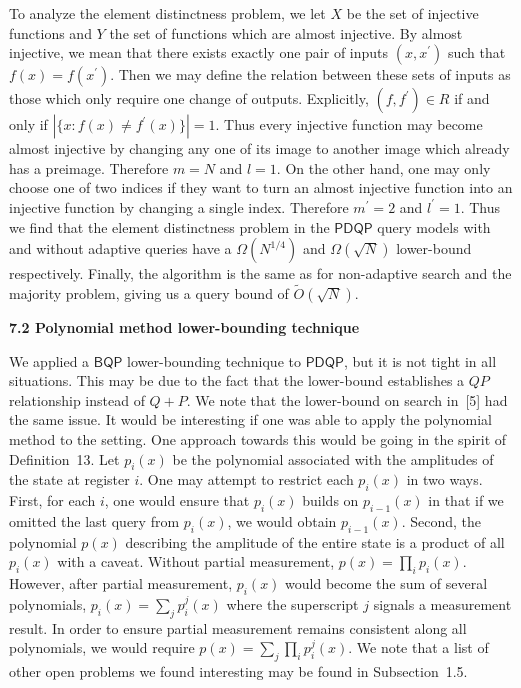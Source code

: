 To analyze the element distinctness problem, we let $X$ be the set of injective functions and $Y$ the set of functions which are almost injective. By almost injective, we mean that there exists exactly one pair of inputs $(x,x^{\prime})$ such that $f(x)=f(x^{\prime})$. Then we may define the relation between these sets of inputs as those which only require one change of outputs. Explicitly, $(f,f^{\prime})\in R$ if and only if $|\{x:f(x)\neq f^{\prime}(x)\}|=1$. Thus every injective function may become almost injective by changing any one of its image to another image which already has a preimage. Therefore $m=N$ and $l=1$. On the other hand, one may only choose one of two indices if they want to turn an almost injective function into an injective function by changing a single index. Therefore $m^{\prime}=2$ and $l^{\prime}=1$. Thus we find that the element distinctness problem in the $\mathsf{PDQP}$ query models with and without adaptive queries have a $\Omega(N^{1/4})$ and $\Omega(\sqrt{N})$ lower-bound respectively. Finally, the algorithm is the same as for non-adaptive search and the majority problem, giving us a query bound of $\tilde{O}(\sqrt{N})$.\par






\par\medskip\noindent\textbf{
7.2 Polynomial method lower-bounding technique}\par




We applied a $\mathsf{BQP}$ lower-bounding technique to $\mathsf{PDQP}$, but it is not tight in all situations. This may be due to the fact that the lower-bound establishes a $QP$ relationship instead of $Q+P$. We note that the lower-bound on search in [5] had the same issue. It would be interesting if one was able to apply the polynomial method to the setting. One approach towards this would be going in the spirit of Definition 13. Let $p_{i}(x)$ be the polynomial associated with the amplitudes of the state at register $i$. One may attempt to restrict each $p_{i}(x)$ in two ways. First, for each $i$, one would ensure that $p_{i}(x)$ builds on $p_{i-1}(x)$ in that if we omitted the last query from $p_{i}(x)$, we would obtain $p_{i-1}(x)$. Second, the polynomial $p(x)$ describing the amplitude of the entire state is a product of all $p_{i}(x)$ with a caveat. Without partial measurement, $p(x)=\prod_{i}p_{i}(x)$. However, after partial measurement, $p_{i}(x)$ would become the sum of several polynomials, $p_{i}(x)=\sum_{j}p_{i}^{j}(x)$ where the superscript $j$ signals a measurement result. In order to ensure partial measurement remains consistent along all polynomials, we would require $p(x)=\sum_{j}\prod_{i}p_{i}^{j}(x)$. We note that a list of other open problems we found interesting may be found in Subsection 1.5.\par







